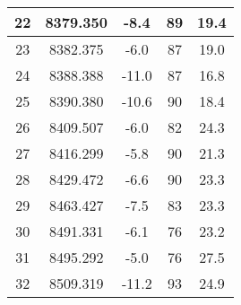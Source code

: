 \begin{table}[htbp]
\begin{tabular}{|c|c|c|c|c|}
    \hline
    22    & 8379.350 & -8.4  & 89    & 19.4 \bigstrut\\
    \hline
    23    & 8382.375 & -6.0  & 87    & 19.0 \bigstrut\\
    \hline
    24    & 8388.388 & -11.0 & 87    & 16.8 \bigstrut\\
    \hline
    25    & 8390.380 & -10.6 & 90    & 18.4 \bigstrut\\
    \hline
    26    & 8409.507 & -6.0  & 82    & 24.3 \bigstrut\\
    \hline
    27    & 8416.299 & -5.8  & 90    & 21.3 \bigstrut\\
    \hline
    28    & 8429.472 & -6.6  & 90    & 23.3 \bigstrut\\
    \hline
    29    & 8463.427 & -7.5  & 83    & 23.3 \bigstrut\\
    \hline
    30    & 8491.331 & -6.1  & 76    & 23.2 \bigstrut\\
    \hline
    31    & 8495.292 & -5.0  & 76    & 27.5 \bigstrut\\
    \hline
    32    & 8509.319 & -11.2 & 93    & 24.9 \bigstrut\\
    \hline
    \end{tabular}%
  \label{tab:addlabel}%
\end{table}%
